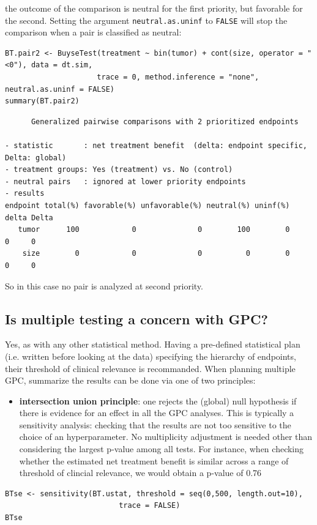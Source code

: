 \documentclass[12pt]{article}
\begin{document}
the outcome of the comparison is neutral for the first priority, but
favorable for the second. Setting the argument \texttt{neutral.as.uninf} to
\texttt{FALSE} will stop the comparison when a pair is classified as neutral:
\lstset{language=r,label= ,caption= ,captionpos=b,numbers=none}
\begin{lstlisting}
BT.pair2 <- BuyseTest(treatment ~ bin(tumor) + cont(size, operator = "<0"), data = dt.sim,
                     trace = 0, method.inference = "none", neutral.as.uninf = FALSE)
summary(BT.pair2)
\end{lstlisting}

\begin{verbatim}
      Generalized pairwise comparisons with 2 prioritized endpoints

- statistic       : net treatment benefit  (delta: endpoint specific, Delta: global) 
- treatment groups: Yes (treatment) vs. No (control) 
- neutral pairs   : ignored at lower priority endpoints
- results
endpoint total(%) favorable(%) unfavorable(%) neutral(%) uninf(%) delta Delta
   tumor      100            0              0        100        0     0     0
    size        0            0              0          0        0     0     0
\end{verbatim}


So in this case no pair is analyzed at second priority.

\clearpage

\subsection{Is multiple testing a concern with GPC?}
\label{sec:orgfc20549}

Yes, as with any other statistical method. Having a pre-defined
statistical plan (i.e. written before looking at the data) specifying
the hierarchy of endpoints, their threshold of clinical relevance is
recommanded. When planning multiple GPC, summarize the results can be
done via one of two principles:
\begin{itemize}
\item \textbf{intersection union principle}: one rejects the (global) null
hypothesis if there is evidence for an effect in all the GPC
analyses. This is typically a sensitivity analysis: checking that
the results are not too sensitive to the choice of an
hyperparameter. No multiplicity adjustment is needed other than
considering the largest p-value among all tests. For instance, when
checking whether the estimated net treatment benefit is similar across a range
of threshold of clincial relevance, we would obtain a p-value of
0.76
\end{itemize}
\lstset{language=r,label= ,caption= ,captionpos=b,numbers=none}
\begin{lstlisting}
BTse <- sensitivity(BT.ustat, threshold = seq(0,500, length.out=10),
                          trace = FALSE)
BTse
\end{lstlisting}
\end{document}
